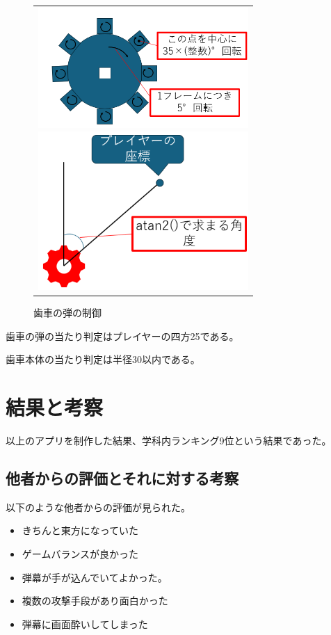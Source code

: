 \documentclass[a4paper,titlepage,11pt]{ltjsarticle}
\begin{document}
\begin{figure}[H]
\begin{center}
\begin{tabular}{c}
\begin{minipage}{0.5\hsize}
\begin{center}
\includegraphics[width=8cm]{gear.png}
\end{center}
\caption{歯車の描画}
\label{gear}
\end{minipage}
\begin{minipage}{0.5\hsize}
\begin{center}
\includegraphics[width=8cm]{atan2.png}
\end{center}
\caption{歯車の弾の制御}
\label{atan2}
\end{minipage}
\end{tabular}
\end{center}
\end{figure}



歯車の弾の当たり判定はプレイヤーの四方25である。

歯車本体の当たり判定は半径30以内である。
\section{結果と考察}
以上のアプリを制作した結果、学科内ランキング9位という結果であった。
\subsection{他者からの評価とそれに対する考察}
以下のような他者からの評価が見られた。
\begin{itemize}
	\item きちんと東方になっていた
	\item ゲームバランスが良かった
	\item 弾幕が手が込んでいてよかった。
	\item 複数の攻撃手段があり面白かった
	\item 弾幕に画面酔いしてしまった
\end{itemize}
\end{document}
